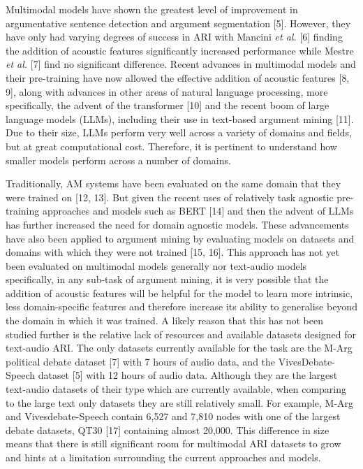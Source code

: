 \documentclass[twocolumn,twoside]{article}
\begin{document}
Multimodal models have shown the greatest level of improvement in
argumentative sentence detection and argument segmentation {[}5{]}.
However, they have only had varying degrees of success in ARI with
Mancini \emph{et al.} {[}6{]} finding the addition of acoustic features
significantly increased performance while Mestre \emph{et al.} {[}7{]}
find no significant difference. Recent advances in multimodal models and
their pre-training have now allowed the effective addition of acoustic
features {[}8, 9{]}, along with advances in other areas of natural
language processing, more specifically, the advent of the transformer
{[}10{]} and the recent boom of large language models (LLMs), including
their use in text-based argument mining {[}11{]}. Due to their size,
LLMs perform very well across a variety of domains and fields, but at
great computational cost. Therefore, it is pertinent to understand how
smaller models perform across a number of domains.

Traditionally, AM systems have been evaluated on the same domain that
they were trained on {[}12, 13{]}. But given the recent uses of
relatively task agnostic pre-training approaches and models such as BERT
{[}14{]} and then the advent of LLMs has further increased the need for
domain agnostic models. These advancements have also been applied to
argument mining by evaluating models on datasets and domains with which
they were not trained {[}15, 16{]}. This approach has not yet been
evaluated on multimodal models generally nor text-audio models
specifically, in any sub-task of argument mining, it is very possible
that the addition of acoustic features will be helpful for the model to
learn more intrinsic, less domain-specific features and therefore
increase its ability to generalise beyond the domain in which it was
trained. A likely reason that this has not been studied further is the
relative lack of resources and available datasets designed for
text-audio ARI. The only datasets currently available for the task are
the M-Arg political debate dataset {[}7{]} with 7 hours of audio data,
and the VivesDebate-Speech dataset {[}5{]} with 12 hours of audio data.
Although they are the largest text-audio datasets of their type which
are currently available, when comparing to the large text only datasets
they are still relatively small. For example, M-Arg and
Vivesdebate-Speech contain 6,527 and 7,810 nodes with one of the largest
debate datasets, QT30 {[}17{]} containing almost 20,000. This difference
in size means that there is still significant room for multimodal ARI
datasets to grow and hints at a limitation surrounding the current
approaches and models.
\end{document}
